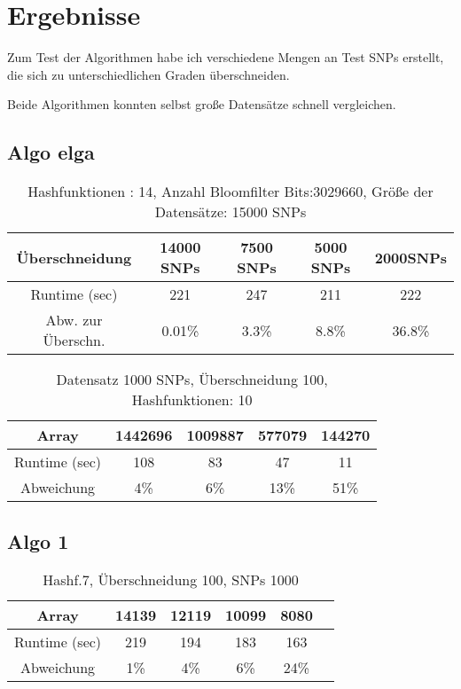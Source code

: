 \chapter{Ergebnisse}

Zum Test der Algorithmen habe ich verschiedene Mengen an Test SNPs erstellt, die sich zu unterschiedlichen Graden überschneiden.


Beide Algorithmen konnten selbst große Datensätze schnell vergleichen.

\section{Algo elga}

 \begin{table}[h]
 	\begin{tabular}{c|c|c|c|c}
 		Überschneidung&14000 SNPs&7500 SNPs&5000 SNPs&2000SNPs\\
 		\hline
 		Runtime (sec)& 221&247&211&222\\
 		Abw. zur Überschn.& 0.01\%& 3.3\%&8.8\%&36.8\%\\
 		
 	\end{tabular}
 	\caption{Hashfunktionen : 14, Anzahl Bloomfilter Bits:3029660, Größe der Datensätze: 15000 SNPs }
 	\label{tab:meinetabelle1}
 	
 	
 \end{table}
 
 \begin{table}[h]
 	
 	
 	\begin{tabular}{c|c|c|c|c}
 		Array& 1442696&1009887&577079&144270\\
 		\hline
 		Runtime (sec)& 108&83&47&11\\
 		Abweichung&4\%&6\%&13\%&51\%\\
 		
 		
 	\end{tabular}
 	\caption{Datensatz 1000 SNPs, Überschneidung 100, Hashfunktionen: 10 }
 	\label{tab:meinetabelle2}
 \end{table}
 
\section{Algo 1}

	\begin{table}[h]
		
		\begin{tabular}{c|c|c|c|c|c}
			Array&14139&12119&10099&8080\\
			\hline
			Runtime (sec)&219&194&183&163\\
			Abweichung&1\%&4\%&6\%&24\%\\
			
			
		\end{tabular}
		\caption{Hashf.7, Überschneidung 100, SNPs 1000 }
		\label{tab:meinetabelle5}
	\end{table}